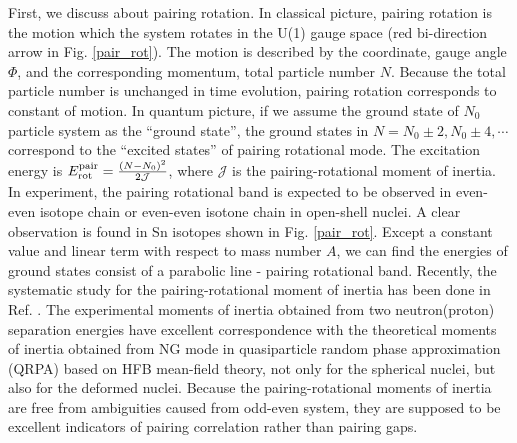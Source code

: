 \documentclass[11pt]{book} %
\begin{document}
First, we discuss about pairing rotation. In classical picture, pairing rotation is the motion which the system rotates in the U(1) gauge space (red bi-direction arrow in Fig. \ref{pair_rot}). The motion is described by the coordinate, gauge angle $\Phi$, and the corresponding momentum, total particle number $N$. 
Because the total particle number is unchanged in time evolution, pairing rotation corresponds to constant of motion. In quantum picture, if we assume the ground state of $N_0$ particle system as the ``ground state'', the ground states in $N=N_0\pm2, N_0\pm4,\cdots$ correspond to the ``excited states'' of pairing rotational mode. The excitation energy is $E_{\rm rot}^{\rm pair}=\frac{(N-N_0)^2}{2\mathcal{J}}$, where $\mathcal{J}$ is the pairing-rotational moment of inertia. In experiment, the pairing rotational band is expected to be observed in even-even isotope chain or even-even isotone chain in open-shell nuclei. A clear observation is found in Sn isotopes shown in Fig. \ref{pair_rot}. Except a constant value and linear term with respect to mass number $A$, we can find the energies of ground states consist of a parabolic line - pairing rotational band. Recently, the systematic study for the pairing-rotational moment of inertia has been done in Ref. \cite{HN16}. The experimental moments of inertia obtained from two neutron(proton) separation energies have excellent correspondence with the theoretical moments of inertia obtained from NG mode in quasiparticle random phase approximation (QRPA) \cite{TV61} based on HFB mean-field theory, not only for the spherical nuclei, but also for the deformed nuclei. Because the pairing-rotational moments of inertia are free from ambiguities caused from odd-even system, they are supposed to be excellent indicators of pairing correlation rather than pairing gaps.
\end{document}
